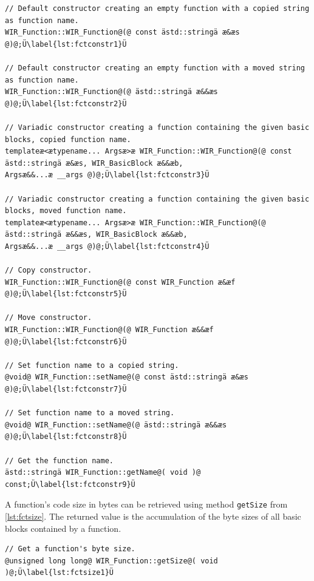 \begin{lstlisting}[style=code,float=ht,caption={Constructors and Methods for Name Handling of Class \texttt{WIR\_Function}},label=lst:fctconstruction]
// Default constructor creating an empty function with a copied string as function name.
WIR_Function::WIR_Function@(@ const ästd::stringä æ&æs @)@;Ü\label{lst:fctconstr1}Ü

// Default constructor creating an empty function with a moved string as function name.
WIR_Function::WIR_Function@(@ ästd::stringä æ&&æs @)@;Ü\label{lst:fctconstr2}Ü

// Variadic constructor creating a function containing the given basic blocks, copied function name.
templateæ<ætypename... Argsæ>æ WIR_Function::WIR_Function@(@ const ästd::stringä æ&æs, WIR_BasicBlock æ&&æb,                                                                 Argsæ&&...æ __args @)@;Ü\label{lst:fctconstr3}Ü

// Variadic constructor creating a function containing the given basic blocks, moved function name.
templateæ<ætypename... Argsæ>æ WIR_Function::WIR_Function@(@ ästd::stringä æ&&æs, WIR_BasicBlock æ&&æb,                                                                      Argsæ&&...æ __args @)@;Ü\label{lst:fctconstr4}Ü

// Copy constructor.
WIR_Function::WIR_Function@(@ const WIR_Function æ&æf @)@;Ü\label{lst:fctconstr5}Ü

// Move constructor.
WIR_Function::WIR_Function@(@ WIR_Function æ&&æf @)@;Ü\label{lst:fctconstr6}Ü

// Set function name to a copied string.
@void@ WIR_Function::setName@(@ const ästd::stringä æ&æs @)@;Ü\label{lst:fctconstr7}Ü

// Set function name to a moved string.
@void@ WIR_Function::setName@(@ ästd::stringä æ&&æs @)@;Ü\label{lst:fctconstr8}Ü

// Get the function name.
ästd::stringä WIR_Function::getName@( void )@ const;Ü\label{lst:fctconstr9}Ü
\end{lstlisting}

A function's code size in bytes can be retrieved using method \texttt{getSize} from \cref{lst:fctsize}.
The returned value is the accumulation of the byte sizes of all basic blocks contained by a function.

\begin{lstlisting}[style=code,float=h,caption={Size Computation by Class \texttt{WIR\_Function}},label=lst:fctsize]
// Get a function's byte size.
@unsigned long long@ WIR_Function::getSize@( void )@;Ü\label{lst:fctsize1}Ü
\end{lstlisting}

